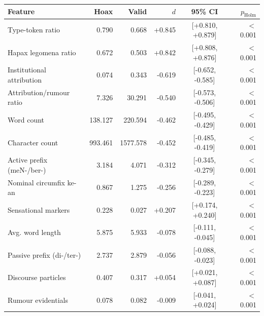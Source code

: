 \begin{tabular}{lrrrcr}
\toprule
Feature & Hoax & Valid & $d$ & 95\% CI & $p_{\text{Holm}}$ \\
\midrule
Type-token ratio & 0.790 & 0.668 & +0.845 & [+0.810, +0.879] & $<$0.001 \\
Hapax legomena ratio & 0.672 & 0.503 & +0.842 & [+0.808, +0.876] & $<$0.001 \\
Institutional attribution & 0.074 & 0.343 & -0.619 & [-0.652, -0.585] & $<$0.001 \\
Attribution/rumour ratio & 7.326 & 30.291 & -0.540 & [-0.573, -0.506] & $<$0.001 \\
Word count & 138.127 & 220.594 & -0.462 & [-0.495, -0.429] & $<$0.001 \\
Character count & 993.461 & 1577.578 & -0.452 & [-0.485, -0.419] & $<$0.001 \\
Active prefix (meN-/ber-) & 3.184 & 4.071 & -0.312 & [-0.345, -0.279] & $<$0.001 \\
Nominal circumfix ke-an & 0.867 & 1.275 & -0.256 & [-0.289, -0.223] & $<$0.001 \\
Sensational markers & 0.228 & 0.027 & +0.207 & [+0.174, +0.240] & $<$0.001 \\
Avg. word length & 5.875 & 5.933 & -0.078 & [-0.111, -0.045] & $<$0.001 \\
Passive prefix (di-/ter-) & 2.737 & 2.879 & -0.056 & [-0.088, -0.023] & $<$0.001 \\
Discourse particles & 0.407 & 0.317 & +0.054 & [+0.021, +0.087] & $<$0.001 \\
Rumour evidentials & 0.078 & 0.082 & -0.009 & [-0.041, +0.024] & $<$0.001 \\
\bottomrule
\end{tabular}%
